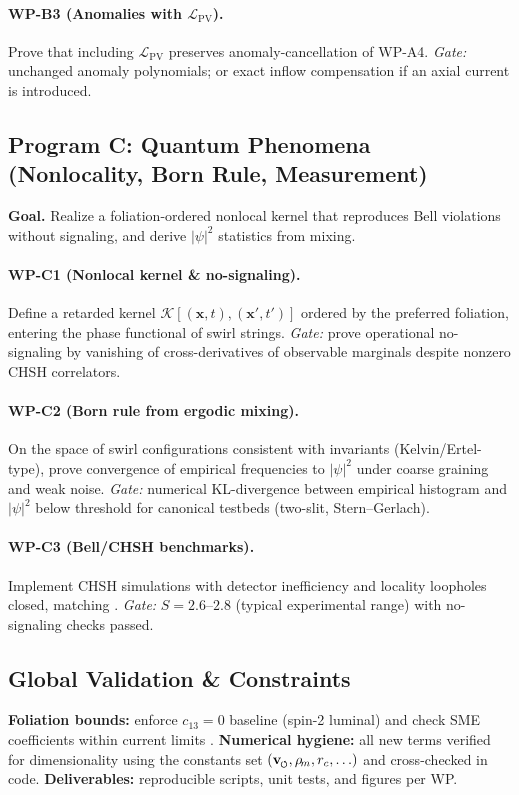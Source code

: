 \documentclass[smallextended]{svjour3}       %
\newcommand{\swirlarrow}{%
	\mathchoice{\mkern-2mu\scriptstyle\boldsymbol{\circlearrowleft}}%
	{\mkern-2mu\scriptstyle\boldsymbol{\circlearrowleft}}%
	{\mkern-2mu\scriptscriptstyle\boldsymbol{\circlearrowleft}}%
	{\mkern-2mu\scriptscriptstyle\boldsymbol{\circlearrowleft}}%
}
\newcommand{\vswirl}{\mathbf{v}_{\swirlarrow}}
\newcommand{\rhoE}{\rho_{\!E}}      %
\newcommand{\rhoM}{\rho_{\!m}}      %
\begin{document}
    \paragraph{WP-B3 (Anomalies with $\mathcal{L}_{\mathrm{PV}}$).}
    Prove that including $\mathcal{L}_{\mathrm{PV}}$ preserves anomaly-cancellation of WP-A4.
    \emph{Gate:} unchanged anomaly polynomials; or exact inflow compensation if an axial current is introduced.

    \subsection*{Program C: Quantum Phenomena (Nonlocality, Born Rule, Measurement)}
    \textbf{Goal.} Realize a foliation-ordered nonlocal kernel that reproduces Bell violations without signaling, and derive $|\psi|^2$ statistics from mixing.

    \paragraph{WP-C1 (Nonlocal kernel \& no-signaling).}
    Define a retarded kernel $\mathcal{K}[(\mathbf{x},t),(\mathbf{x}',t')]$ ordered by the preferred foliation, entering the phase functional of swirl strings.
    \emph{Gate:} prove operational no-signaling by vanishing of cross-derivatives of observable marginals despite nonzero CHSH correlators.

    \paragraph{WP-C2 (Born rule from ergodic mixing).}
    On the space of swirl configurations consistent with invariants (Kelvin/Ertel-type), prove convergence of empirical frequencies to $|\psi|^2$ under coarse graining and weak noise.
    \emph{Gate:} numerical KL-divergence between empirical histogram and $|\psi|^2$ below threshold for canonical testbeds (two-slit, Stern–Gerlach).

    \paragraph{WP-C3 (Bell/CHSH benchmarks).}
    Implement CHSH simulations with detector inefficiency and locality loopholes closed, matching \cite{Bell1964,Aspect1982,Hensen2015,Giustina2015}.
    \emph{Gate:} $S=2.6\text{–}2.8$ (typical experimental range) with no-signaling checks passed.

    \subsection*{Global Validation \& Constraints}
    \textbf{Foliation bounds:} enforce $c_{13}=0$ baseline (spin-2 luminal) and check SME coefficients within current limits \cite{Baker2017_GW170817,Creminelli2017_GW170817,ColladayKostelecky1998}.
    \textbf{Numerical hygiene:} all new terms verified for dimensionality using the constants set $(\vswirl,\rhoM,r_c,\ldots)$ and cross-checked in code.
    \textbf{Deliverables:} reproducible scripts, unit tests, and figures per WP.
\end{document}
